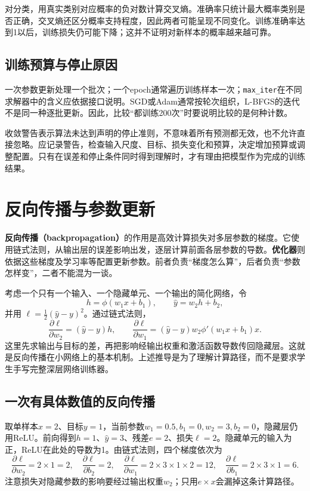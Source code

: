 对分类，用真实类别对应概率的负对数计算交叉熵。准确率只统计最大概率类别是否正确，交叉熵还区分概率支持程度，因此两者可能呈现不同变化。训练准确率达到1以后，训练损失仍可能下降；这并不证明对新样本的概率越来越可靠。

\subsection{训练预算与停止原因}
一次参数更新处理一个批次；一个epoch通常遍历训练样本一次；\texttt{max\_iter}在不同求解器中的含义应依据接口说明。SGD或Adam通常按轮次组织，L-BFGS的迭代不是同一种逐批更新。因此，比较“都训练200次”时要说明比较的是何种计数。

收敛警告表示算法未达到声明的停止准则，不意味着所有预测都无效，也不允许直接忽略。应记录警告，检查输入尺度、目标、损失变化和预算，决定增加预算或调整配置。只有在误差和停止条件同时得到理解时，才有理由把模型作为完成的训练结果。

\section{反向传播与参数更新}
\textbf{反向传播（backpropagation）}的作用是高效计算损失对多层参数的梯度。它使用链式法则，从输出层的误差影响出发，逐层计算前面各层参数的导数。\textbf{优化器}则依据这些梯度及学习率等配置更新参数。前者负责“梯度怎么算”，后者负责“参数怎样变”，二者不能混为一谈。

考虑一个只有一个输入、一个隐藏单元、一个输出的简化网络，令
\begin{equation}
h=\phi(w_1x+b_1),\qquad \hat y=w_2h+b_2,
\end{equation}
并用 $\ell=\frac12(\hat y-y)^2$。通过链式法则，
\begin{equation}
\frac{\partial\ell}{\partial w_2}=(\hat y-y)h,
\qquad
\frac{\partial\ell}{\partial w_1}=(\hat y-y)w_2\phi'(w_1x+b_1)x.
\end{equation}
这里先求输出与目标的差，再把影响经输出权重和激活函数导数传回隐藏层。这就是反向传播在小网络上的基本机制。上述推导是为了理解计算路径，而不是要求学生手写完整深层网络训练器。

\subsection*{一次有具体数值的反向传播}
取单样本$x=2$、目标$y=1$，当前参数$w_1=0.5,b_1=0,w_2=3,b_2=0$，隐藏层仍用ReLU。前向得到$h=1$、$\hat y=3$、残差$e=2$、损失$\ell=2$。隐藏单元的输入为正，ReLU在此处的导数为1。由链式法则，四个梯度依次为
\[
\frac{\partial\ell}{\partial w_2}=2\times1=2,\quad
\frac{\partial\ell}{\partial b_2}=2,\quad
\frac{\partial\ell}{\partial w_1}=2\times3\times1\times2=12,\quad
\frac{\partial\ell}{\partial b_1}=2\times3\times1=6.
\]
注意损失对隐藏参数的影响要经过输出权重$w_2$；只用$e\times x$会漏掉这条计算路径。

